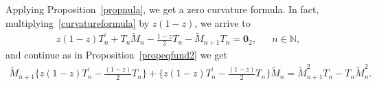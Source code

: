 \documentclass[12pt]{amsart}
\newtheorem{corollary}{Corollary}[section]
\begin{document}
Applying Proposition~\ref{propnula}, we get a zero curvature formula.
In fact, multiplying~\eqref{curvatureformula} by \( z ( 1-z ) \), we arrive to
\begin{align*}%
z(1-z)T_n^\prime +T_n\widetilde{M}_n-\frac{1-z}{2}T_n-\widetilde{M}_{n+1}T_n=\mathbf{0}_{2}, && n \in \mathbb N 
 ,
\end{align*}
and continue as in Proposition~\ref{propeqfund2} we get
\begin{align*}
\widetilde{M}_{n+1}\bigg\{z(1-z)T_n^\prime -\frac{(1-z)}{2}T_n\bigg\}+\bigg\{z(1-z)T_n^\prime -\frac{(1-z)}{2}T_n\bigg\}\widetilde{M}_{n}=\widetilde{M}_{n+1}^2T_n-T_n\widetilde{M}_n^2.
\end{align*}

\end{document}
